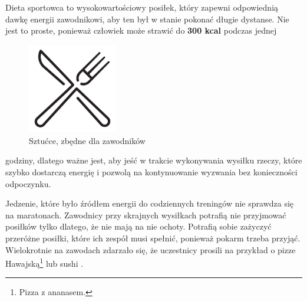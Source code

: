 \documentclass[12pt]{article}
\begin{document}
\noindent Dieta sportowca to wysokowartościowy posiłek, który zapewni odpowiednią dawkę energii zawodnikowi, aby ten był w stanie pokonać długie dystanse. Nie jest to proste, ponieważ człowiek może strawić do \textbf{300 kcal} podczas jednej\begin{figure}
\begin{center}
\vspace{-20pt}
\includegraphics[width=0.35\textwidth]{osiem}
\end{center}
\vspace{-20pt}
\caption{{\scriptsize Sztućce, zbędne dla zawodników}}
\vspace{-10pt}
\end{figure}
 godziny, dlatego ważne jest, aby jeść w trakcie wykonywania wysiłku rzeczy, które szybko dostarczą energię i pozwolą na kontynuowanie wyzwania bez konieczności odpoczynku.

Jedzenie, które było źródłem energii do codziennych treningów nie sprawdza się na maratonach. Zawodnicy przy skrajnych wysiłkach potrafią nie przyjmować posiłków tylko dlatego, że nie mają na nie ochoty. Potrafią sobie zażyczyć przeróżne posiłki, które ich zespół musi spełnić, ponieważ pokarm trzeba przyjąć. Wielokrotnie na zawodach zdarzało się, że uczestnicy prosili na przykład o pizze Hawajską\footnote{Pizza z ananasem.} lub sushi \cite{aumann1992handbook}.
	 
\end{document}
